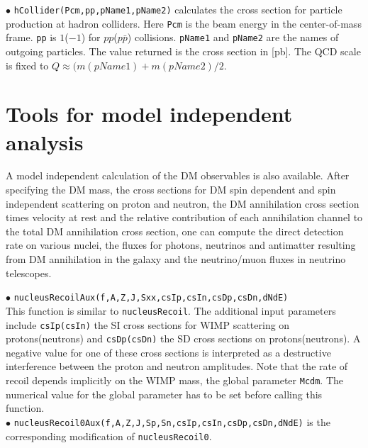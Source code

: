 \documentclass[12pt,a4paper]{article}
\begin{document}
\noindent$\bullet$ \verb|hCollider(Pcm,pp,pName1,pName2)| calculates the cross
section for particle production at hadron colliders. Here \verb|Pcm| 
is the beam energy  in the center-of-mass frame. \verb|pp| is
$1$($-1$) for $pp$($p\bar{p}$) collisions. 
{\tt pName1} and {\tt pName2} are the names of outgoing
particles. The value returned  is the cross section in [pb]. 
The QCD scale is fixed to $Q\approx (m(pName1)+m(pName2)/2$.



\section{Tools for model independent analysis}

A model independent calculation of the DM observables is also available.
After specifying the DM mass, the cross sections for DM  spin dependent and  spin independent scattering on proton and neutron, the DM annihilation cross section times velocity at rest and the relative contribution of  each annihilation channel to the total DM annihilation cross section, one can compute the direct detection rate on   various nuclei, the fluxes for photons, neutrinos and antimatter resulting from DM annihilation in the galaxy and the neutrino/muon fluxes in neutrino telescopes.  

\noindent
$\bullet$ \verb|nucleusRecoilAux(f,A,Z,J,Sxx,csIp,csIn,csDp,csDn,dNdE)|\\
This function is similar to \verb|nucleusRecoil|. 
The additional input parameters include \verb|csIp(csIn)| the SI cross 
sections for WIMP scattering on protons(neutrons) and
\verb|csDp(csDn)| the SD cross sections on protons(neutrons). 
A negative value for one of these cross sections is interpreted as a destructive 
interference between the
proton and neutron amplitudes. Note that the rate of recoil  depends 
implicitly on the WIMP mass, the  global parameter \verb|Mcdm|.
 The numerical value for the global parameter has to be
set before calling this function.\\
\noindent
$\bullet$ \verb|nucleusRecoil0Aux(f,A,Z,J,Sp,Sn,csIp,csIn,csDp,csDn,dNdE)|
is the corresponding modification of \verb|nucleusRecoil0|.\\
\end{document}
